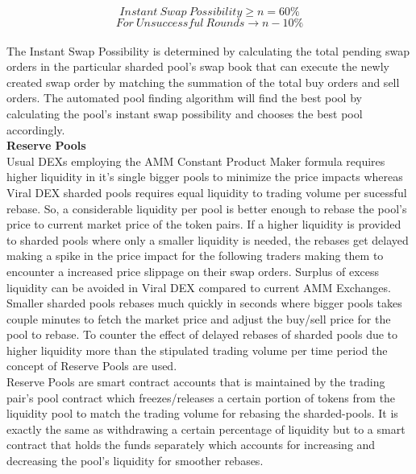 \documentclass[10pt]{article}
\begin{document}
\begin{equation}
Instant\:Swap\:Possibility \geq n = 60\%
\end{equation}
\begin{equation}
For\:Unsuccessful\:Rounds \rightarrow n-10\%
\end{equation}\\
The Instant Swap Possibility is determined by calculating the total pending swap orders in the particular sharded pool's swap book that can execute the newly created swap order by matching the summation of the total buy orders and sell orders. The automated pool finding algorithm will find the best pool by calculating the pool's instant swap possibility and chooses the best pool accordingly.\\

\textbf{Reserve Pools}\\

Usual DEXs employing the AMM Constant Product Maker formula requires higher liquidity in it's single bigger pools to minimize the price impacts whereas Viral DEX sharded pools requires equal liquidity to trading volume per sucessful rebase. So, a considerable liquidity per pool is better enough to rebase the pool's price to current market price of the token pairs. If a higher liquidity is provided to sharded pools where only a smaller liquidity is needed, the rebases get delayed making a spike in the price impact for the following traders making them to encounter a increased price slippage on their swap orders. Surplus of excess liquidity can be avoided in Viral DEX compared to current AMM Exchanges. Smaller sharded pools rebases much quickly in seconds where bigger pools takes couple minutes to fetch the market price and adjust the buy/sell price for the pool to rebase. To counter the effect of delayed rebases of sharded pools due to higher liquidity more than the stipulated trading volume per time period the concept of Reserve Pools are used.\\

Reserve Pools are smart contract accounts that is maintained by the trading pair's pool contract which freezes/releases a certain portion of tokens from the liquidity pool to match the trading volume for rebasing the sharded-pools. It is exactly the same as withdrawing a certain percentage of liquidity but to a smart contract that holds the funds separately which accounts for increasing and decreasing the pool's liquidity for smoother rebases.\\
\end{document}
